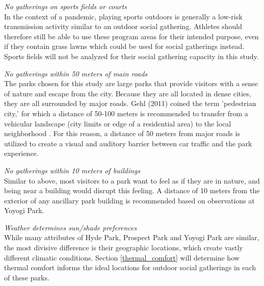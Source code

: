 \begin{multicols}{2}
\textit{No gatherings on sports fields or courts}\\
In the context of a pandemic, playing sports outdoors is generally a low-risk transmission activity similar to an outdoor social gathering. Athletes should therefore still be able to use these program areas for their intended purpose, even if they contain grass lawns which could be used for social gatherings instead. Sports fields will not be analyzed for their social gathering capacity in this study.

\textit{No gatherings within 50 meters of main roads}\\
The parks chosen for this study are large parks that provide visitors with a sense of nature and escape from the city. Because they are all located in dense cities, they are all surrounded by major roads. Gehl (2011) coined the term 'pedestrian city,' for which a distance of 50-100 meters is recommended to transfer from a vehicular landscape (city limits or edge of a residential area) to the local neighborhood \cite{gehl_life_2011}. For this reason, a distance of 50 meters from major roads is utilized to create a visual and auditory barrier between car traffic and the park experience. 

\textit{No gatherings within 10 meters of buildings}\\
Similar to above, most visitors to a park want to feel as if they are in nature, and being near a building would disrupt this feeling. A distance of 10 meters from the exterior of any ancillary park building is recommended based on observations at Yoyogi Park.

\textit{Weather determines sun/shade preferences}\\
While many attributes of Hyde Park, Prospect Park and Yoyogi Park are similar, the most divisive difference is their geographic locations, which create vastly different climatic conditions. Section \ref{thermal_comfort} will determine how thermal comfort informs the ideal locations for outdoor social gatherings in each of these parks.


\end{multicols}
